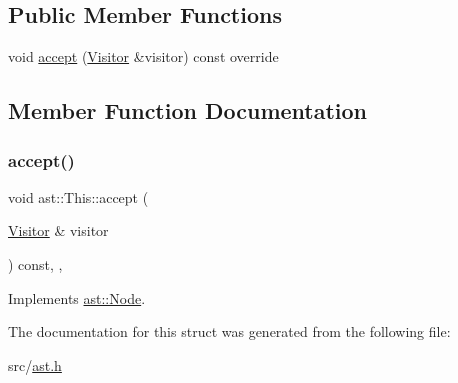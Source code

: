\subsection*{Public Member Functions}
\begin{DoxyCompactItemize}
\item 
void \hyperlink{structast_1_1_this_a9d4469f30d7cfb7b65ce6ef4ee534565}{accept} (\hyperlink{structast_1_1_visitor}{Visitor} \&visitor) const override
\end{DoxyCompactItemize}


\subsection{Member Function Documentation}
\mbox{\label{structast_1_1_this_a9d4469f30d7cfb7b65ce6ef4ee534565}} 
\subsubsection{\texorpdfstring{accept()}{accept()}}
{\footnotesize\ttfamily void ast\+::\+This\+::accept (\begin{DoxyParamCaption}\item[{\hyperlink{structast_1_1_visitor}{Visitor} \&}]{visitor }\end{DoxyParamCaption}) const\hspace{0.3cm}{\ttfamily [inline]}, {\ttfamily [override]}, {\ttfamily [virtual]}}



Implements \hyperlink{structast_1_1_node_abc089ee6caaf06a4445ebdd8391fdebc}{ast\+::\+Node}.



The documentation for this struct was generated from the following file\+:\begin{DoxyCompactItemize}
\item 
src/\hyperlink{ast_8h}{ast.\+h}\end{DoxyCompactItemize}
